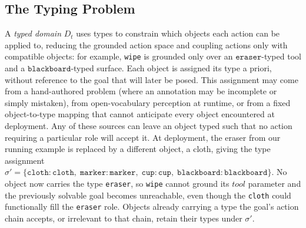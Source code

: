 


\subsection{The Typing Problem}

A \textit{typed domain} $D_t$ uses types to constrain which objects each action can be applied to, reducing the grounded action space and coupling actions only with compatible objects: for example, \texttt{wipe} is grounded only over an $\texttt{eraser}$-typed tool and a $\texttt{blackboard}$-typed surface. Each object is assigned its type a priori, without reference to the goal that will later be posed. This assignment may come from a hand-authored problem (where an annotation may be incomplete or simply mistaken), from open-vocabulary perception at runtime, or from a fixed object-to-type mapping that cannot anticipate every object encountered at deployment. Any of these sources can leave an object typed such that no action requiring a particular role will accept it. At deployment, the eraser from our running example is replaced by a different object, a cloth, giving the type assignment $\sigma' = \{\mathtt{cloth}\!:\!\texttt{cloth},\allowbreak\; \mathtt{marker}\!:\!\texttt{marker},\allowbreak\; \mathtt{cup}\!:\!\texttt{cup},\allowbreak\; \mathtt{blackboard}\!:\!\texttt{blackboard}\}$. No object now carries the type \texttt{eraser}, so \texttt{wipe} cannot ground its $\mathit{tool}$ parameter and the previously solvable goal becomes unreachable, even though the \texttt{cloth} could functionally fill the \texttt{eraser} role. Objects already carrying a type the goal's action chain accepts, or irrelevant to that chain, retain their types under $\sigma'$.

